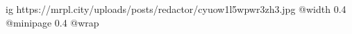  
 
 
 
 

\ifcmt
  ig https://mrpl.city/uploads/posts/redactor/cyuow1l5wpwr3zh3.jpg
  @width 0.4
  @minipage 0.4
  @wrap \parpic[l]
\fi

